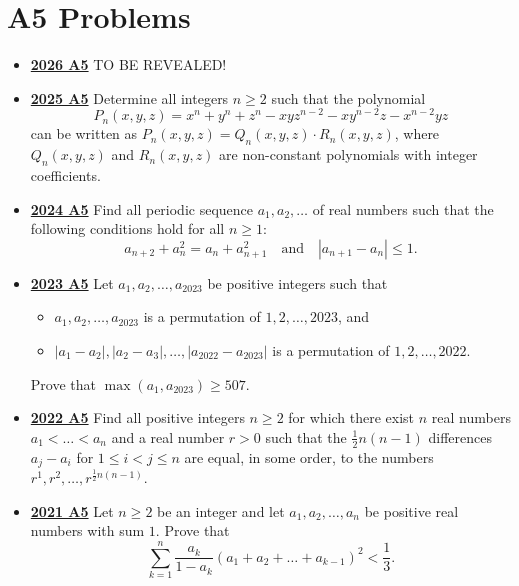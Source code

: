 \documentclass[11pt]{scrartcl}
\begin{document}
 
\newpage
\section*{A5 Problems}  \label{A5}
 \begin{itemize}[leftmargin=*]

 \item \href{https://www.imo-official.org/assets/documents/problems/2026/IMO2026SL.pdf}{\textbf{2026 A5}} TO BE REVEALED!
 
 \item \href{https://artofproblemsolving.com/community/c6h3866881p38677013}{\textbf{2025 A5}} Determine all integers $n \geqslant 2$ such that the polynomial
 $$P_n(x,y,z)=x^n+y^n+z^n-xyz^{n-2}-xy^{n-2}z-x^{n-2}yz$$
 can be written as $P_n(x,y,z)=Q_n(x,y,z)\cdot R_n(x,y,z)$, where $Q_n(x,y,z)$ and $R_n(x,y,z)$ are non-constant polynomials with integer coefficients.
\item \href{https://artofproblemsolving.com/community/c6h3610458p35340939}{\textbf{2024 A5}} Find all periodic sequence $a_1,a_2,\dots$ of real numbers such that the following conditions hold for all $n\geqslant  1$:$$a_{n+2}+a_{n}^2=a_n+a_{n+1}^2\quad\text{and}\quad |a_{n+1}-a_n|\leqslant 1.$$
\item \href{https://artofproblemsolving.com/community/c6h3359722p31218372}{\textbf{2023 A5}} Let $a_1,a_2,\dots,a_{2023}$ be positive integers such that
\begin{itemize}[leftmargin=*]
    \item[$\bullet$]
$a_1,a_2,\dots,a_{2023}$ is a permutation of $1,2,\dots,2023$, and
\item[$\bullet$] $|a_1-a_2|,|a_2-a_3|,\dots,|a_{2022}-a_{2023}|$ is a permutation of $1,2,\dots,2022$.
\end{itemize}
Prove that $\max(a_1,a_{2023})\geqslant 507$.
    \item \href{https://artofproblemsolving.com/community/c6h3107362p28104461}{\textbf{2022 A5}} Find all positive integers $n \geqslant  2$ for which there exist $n$ real numbers $a_1<\dots<a_n$ and a real number $r>0$ such that the $\tfrac{1}{2}n(n-1)$ differences $a_j-a_i$ for $1 \leqslant i<j \leqslant n$ are equal, in some order, to the numbers $r^1,r^2,\dots,r^{\frac{1}{2}n(n-1)}$.
\item \href{https://artofproblemsolving.com/community/c6h2882545p25627517}{\textbf{2021 A5}} Let $n\geqslant  2$ be an integer and let $a_1, a_2, \dots, a_n$ be positive real numbers with sum $1$. Prove that$$\sum_{k=1}^n \frac{a_k}{1-a_k}(a_1+a_2+\dots+a_{k-1})^2 < \frac{1}{3}.$$

\end{itemize}
\end{document}
